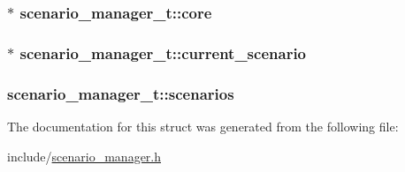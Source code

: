 \subsubsection[{\texorpdfstring{core}{core}}]{$\ast$ scenario\+\_\+manager\+\_\+t\+::core}\hypertarget{structscenario__manager__t_a4fff49d96cbc989dad6aea0594165a5d}{}\label{structscenario__manager__t_a4fff49d96cbc989dad6aea0594165a5d}
\subsubsection[{\texorpdfstring{current\+\_\+scenario}{current\_scenario}}]{$\ast$ scenario\+\_\+manager\+\_\+t\+::current\+\_\+scenario}\hypertarget{structscenario__manager__t_aa74df73bef016afb248a2c2df004bc8e}{}\label{structscenario__manager__t_aa74df73bef016afb248a2c2df004bc8e}
\subsubsection[{\texorpdfstring{scenarios}{scenarios}}]{ scenario\+\_\+manager\+\_\+t\+::scenarios}\hypertarget{structscenario__manager__t_a3143c7412ad621c612faf9549b2826ad}{}\label{structscenario__manager__t_a3143c7412ad621c612faf9549b2826ad}


The documentation for this struct was generated from the following file\+:\begin{DoxyCompactItemize}
\item 
include/\hyperlink{scenario__manager_8h}{scenario\+\_\+manager.\+h}\end{DoxyCompactItemize}
